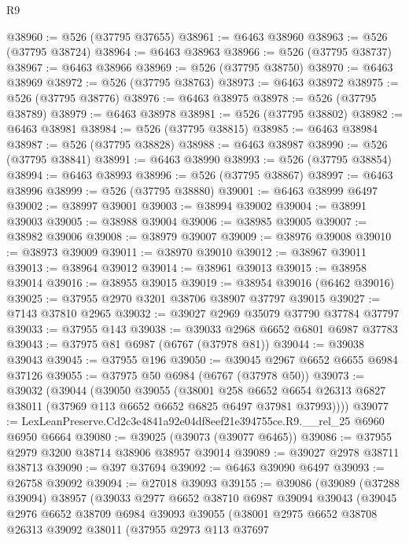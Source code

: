 \begin{lexlean}{R9}
\begin{coremodule}
@38960 := @526 (@37795 @37655)
@38961 := @6463 @38960
@38963 := @526 (@37795 @38724)
@38964 := @6463 @38963
@38966 := @526 (@37795 @38737)
@38967 := @6463 @38966
@38969 := @526 (@37795 @38750)
@38970 := @6463 @38969
@38972 := @526 (@37795 @38763)
@38973 := @6463 @38972
@38975 := @526 (@37795 @38776)
@38976 := @6463 @38975
@38978 := @526 (@37795 @38789)
@38979 := @6463 @38978
@38981 := @526 (@37795 @38802)
@38982 := @6463 @38981
@38984 := @526 (@37795 @38815)
@38985 := @6463 @38984
@38987 := @526 (@37795 @38828)
@38988 := @6463 @38987
@38990 := @526 (@37795 @38841)
@38991 := @6463 @38990
@38993 := @526 (@37795 @38854)
@38994 := @6463 @38993
@38996 := @526 (@37795 @38867)
@38997 := @6463 @38996
@38999 := @526 (@37795 @38880)
@39001 := @6463 @38999 @6497
@39002 := @38997 @39001
@39003 := @38994 @39002
@39004 := @38991 @39003
@39005 := @38988 @39004
@39006 := @38985 @39005
@39007 := @38982 @39006
@39008 := @38979 @39007
@39009 := @38976 @39008
@39010 := @38973 @39009
@39011 := @38970 @39010
@39012 := @38967 @39011
@39013 := @38964 @39012
@39014 := @38961 @39013
@39015 := @38958 @39014
@39016 := @38955 @39015
@39019 := @38954 @39016 (@6462 @39016)
@39025 := @37955 @2970 @3201 @38706 @38907 @37797 @39015
@39027 := @7143 @37810 @2965
@39032 := @39027 @2969 @35079 @37790 @37784 @37797
@39033 := @37955 @143
@39038 := @39033 @2968 @6652 @6801 @6987 @37783
@39043 := @37975 @81 @6987 (@6767 (@37978 @81))
@39044 := @39038 @39043
@39045 := @37955 @196
@39050 := @39045 @2967 @6652 @6655 @6984 @37126
@39055 := @37975 @50 @6984 (@6767 (@37978 @50))
@39073 := @39032
    (@39044
      (@39050
        @39055
        (@38001
          @258
          @6652
          @6654
          @26313
          @6827
          @38011
          (@37969 @113 @6652 @6652 @6825 @6497 @37981 @37993))))
@39077 := LexLeanPreserve.Cd2c3e4841a92e04df8eef21e394755ce.R9.__rel_25 @6960 @6950 @6664
@39080 := @39025 (@39073 (@39077 @6465))
@39086 := @37955 @2979 @3200 @38714 @38906 @38957 @39014
@39089 := @39027 @2978 @38711 @38713
@39090 := @397 @37694
@39092 := @6463 @39090 @6497
@39093 := @26758 @39092
@39094 := @27018 @39093
@39155 := @39086
    (@39089
      (@37288 @39094)
      @38957
      (@39033
        @2977
        @6652
        @38710
        @6987
        @39094
        @39043
        (@39045
          @2976
          @6652
          @38709
          @6984
          @39093
          @39055
          (@38001
            @2975
            @6652
            @38708
            @26313
            @39092
            @38011
            (@37955
              @2973
              @113
              @37697

\end{coremodule}
\end{lexlean}
